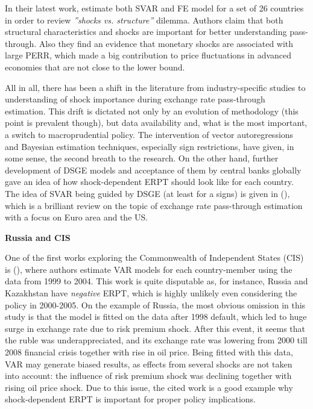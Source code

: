\documentclass[12pt, a4paper]{extarticle}
\begin{document}
In their latest work, \textcite{Forbes2020} estimate both SVAR and FE model for a set of 26 countries in order to review \textit{''shocks vs. structure''} dilemma. Authors claim that both structural characteristics and shocks are important for better understanding pass-through. Also they find an evidence that monetary shocks are associated with large PERR, which made a big contribution to price fluctuations in advanced economies that are not close to the lower bound.

All in all, there has been a shift in the literature from industry-specific studies to understanding of shock importance during exchange rate pass-through estimation. This drift is dictated not only by an evolution of methodology (this point is prevalent though), but data availability and, what is the most important, a switch to macroprudential policy. The intervention of vector autoregressions and Bayesian estimation techniques, especially sign restrictions, have given, in some sense, the second breath to the research. On the other hand, further development of DSGE models and acceptance of them by central banks globally gave an idea of how shock-dependent ERPT should look like for each country. The idea of SVAR being guided by DSGE (at least for a signs) is given in (\cite{Ortega2020}), which is a brilliant review on the topic of exchange rate pass-through estimation with a focus on Euro area and the US.

\begin{center}
	\textbf{Russia and CIS}
\end{center}

One of the first works exploring the Commonwealth of Independent States (CIS) is (\cite{Korhonen2006}), where authors estimate VAR models for each country-member using the data from 1999 to 2004. This work is quite disputable as, for instance, Russia and Kazakhstan have \textit{negative} ERPT, which is highly unlikely even considering the policy in 2000-2005. On the example of Russia, the most obvious omission in this study is that the model is fitted on the data after 1998 default, which led to huge surge in exchange rate due to risk premium shock. After this event, it seems that the ruble was underappreciated, and its exchange rate was lowering from 2000 till 2008 financial crisis together with rise in oil price. Being fitted with this data, VAR may generate biased results, as effects from several shocks are not taken into account: the influence of risk premium shock was declining together with rising oil price shock. Due to this issue, the cited work is a good example why shock-dependent ERPT is important for proper policy implications.
\end{document}
